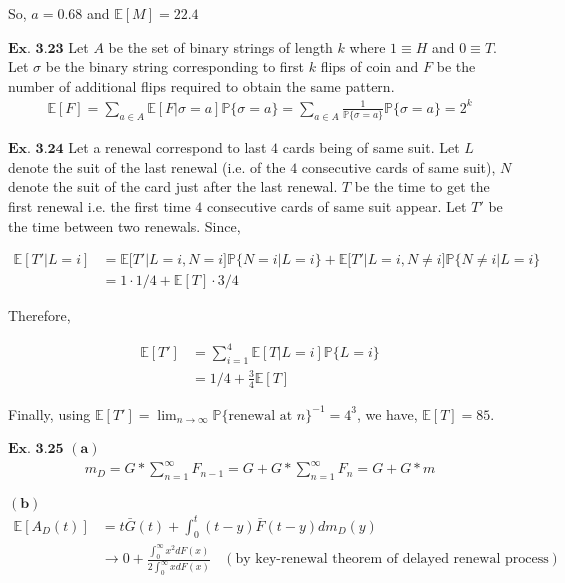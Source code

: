 \documentclass{article}
\begin{document}
So, $a = 0.68$ and $\mathbb{E}[M] = 22.4$

\vspace{0.2in}
${\textbf{Ex. 3.23}}$
Let $A$ be the set of binary strings of length $k$ where $1\equiv H$ and $0 \equiv T$. Let $\sigma$ be the binary string corresponding to first $k$ flips of coin and $F$ be the number of additional flips required to obtain the same pattern.
\begin{align*}
\mathbb{E}[F] = \sum_{a\in A}\mathbb{E}[F|\sigma = a]\mathbb{P}\{\sigma = a\} = \sum_{a \in A} \frac{1}{\mathbb{P}\{\sigma = a\}}\mathbb{P}\{\sigma = a\} = 2^{k}
\end{align*}

\vspace{0.2in}
${\textbf{Ex. 3.24}}$
Let a renewal correspond to last $4$ cards being of same suit. Let $L$ denote the suit of the last renewal (i.e. of the $4$ consecutive cards of same suit), $N$ denote the suit of the card just after the last renewal. $T$ be the time to get the first renewal i.e. the first time $4$ consecutive cards of same suit appear. Let $T'$ be the time between two renewals. Since, 

\begin{align*}
\mathbb{E}[T'|L=i] &= \mathbb{E}[T'|L=i,N=i]\mathbb{P}\{N=i|L=i\} + \mathbb{E}[T'|L=i,N\neq i]\mathbb{P}\{N\neq i|L=i\} \\
&= 1\cdot 1/4+\mathbb{E}[T]\cdot 3/4
\end{align*}

Therefore,

\begin{align*}
\mathbb{E}[T'] &= \sum_{i=1}^{4}\mathbb{E}[T|L=i]\mathbb{P}\{L=i\}\\
&= 1/4+\frac{3}{4}\mathbb{E}[T]
\end{align*}

Finally, using $\mathbb{E}[T'] = \lim_{n\rightarrow \infty}\mathbb{P}\{\text{renewal at }n\}^{-1} = 4^{3}$, we have, $\mathbb{E}[T] = 85$.

\vspace{0.2in}
${\textbf{Ex. 3.25}}$
$\mathbf{(a)}$
\begin{align*}
m_{D} = G*\sum_{n=1}^{\infty}F_{n-1} = G+ G*\sum_{n=1}^{\infty}F_{n} = G+G*m
\end{align*}

$\mathbf{(b)}$
\begin{align*}
\mathbb{E}[A_{D}(t)] &= t\bar{G}(t) + \int_{0}^{t}(t-y)\bar{F}(t-y)dm_{D}(y)\\
&\rightarrow 0 + \frac{\int_{0}^{\infty}x^2dF(x)}{2\int_{0}^{\infty}xdF(x)} \ \ \ \ (\text{by key-renewal theorem of delayed renewal process})
\end{align*}
\end{document}
